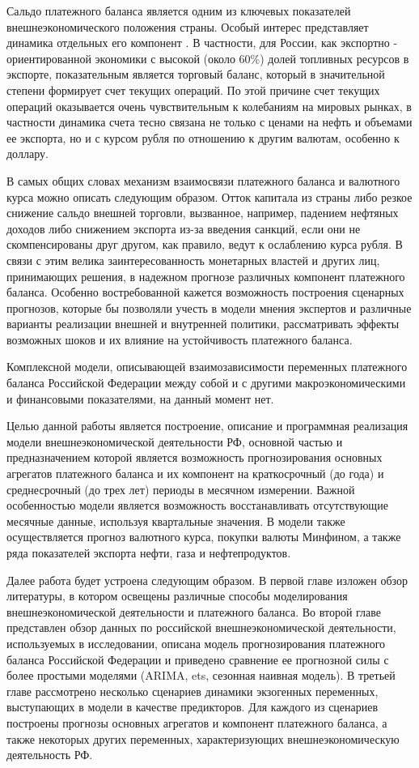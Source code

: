 \documentclass[a4paper, 14pt]{extarticle}
\begin{document}
Сальдо платежного баланса является одним из ключевых показателей внешнеэкономического положения страны. 
Особый интерес представляет динамика отдельных его компонент .
В частности, для России, как экспортно - ориентированной экономики с высокой (около $60 \%$) долей топливных ресурсов в экспорте, показательным является торговый баланс, который в значительной степени формирует счет текущих операций. 
По этой причине счет текущих операций оказывается очень чувствительным к колебаниям на мировых рынках, в частности динамика счета тесно связана не только с ценами на нефть и объемами ее  экспорта, но и с курсом рубля по отношению к другим валютам, особенно к доллару.

В самых общих словах механизм взаимосвязи платежного баланса и валютного курса можно описать следующим образом. 
Отток капитала из страны либо резкое снижение сальдо внешней торговли, вызванное, например, падением нефтяных доходов либо снижением экспорта из-за введения санкций, если они не скомпенсированы друг другом, как правило, ведут к ослаблению курса рубля. 
В связи с этим велика заинтересованность монетарных властей и других лиц, принимающих решения, в надежном прогнозе различных компонент платежного баланса.
Особенно востребованной кажется возможность построения сценарных прогнозов, которые бы позволяли учесть в модели мнения экспертов и различные варианты реализации внешней и внутренней политики, рассматривать эффекты возможных шоков и их влияние на устойчивость платежного баланса.

Комплексной модели, описывающей взаимозависимости переменных платежного баланса Российской Федерации между собой и с другими макроэкономическими и финансовыми показателями, на данный момент нет.  

Целью данной работы является построение, описание и программная реализация модели внешнеэкономической деятельности РФ, основной частью и предназначением которой является возможность прогнозирования основных агрегатов платежного баланса и их компонент на краткосрочный (до года) и среднесрочный (до трех лет) периоды в месячном измерении. 
Важной особенностью модели является возможность восстанавливать отсутствующие месячные данные, используя квартальные значения. 
В модели также осуществляется прогноз валютного курса, покупки валюты Минфином, а также ряда показателей экспорта нефти, газа и нефтепродуктов.

Далее работа будет устроена следующим образом. 
В первой главе изложен обзор литературы, в котором освещены различные способы моделирования внешнеэкономической деятельности и платежного баланса. 
Во второй главе представлен обзор данных по российской внешнеэкономической деятельности, используемых в исследовании, описана модель прогнозирования платежного баланса Российской Федерации и приведено сравнение ее прогнозной силы с более простыми моделями (ARIMA, ets, сезонная наивная модель).
В третьей главе рассмотрено несколько сценариев динамики экзогенных переменных, выступающих в модели в качестве предикторов. 
Для каждого из сценариев построены прогнозы основных агрегатов и компонент платежного баланса, а также некоторых других переменных, характеризующих внешнеэкономическую деятельность РФ.
\newpage
\end{document}
